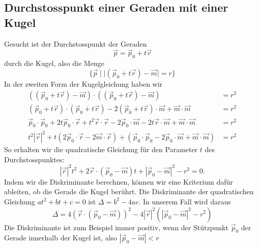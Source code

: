 \subsection{Durchstosspunkt einer Geraden mit einer Kugel
\label{durchstosspunktkugel}}
Gesucht ist der Durchstosspunkt der Geraden
\[
\vec p=\vec p_0+t\vec r
\]
durch die Kugel, also die Menge
\[
\{\vec p\;| \;|(\vec p_0+t\vec r)-\vec m|=r\}
\]
In der zweiten Form der Kugelgleichung haben wir
\begin{align*}
((\vec p_0+t\vec r)-\vec m)
\cdot
((\vec p_0+t\vec r)-\vec m)&=r^2
\\
(\vec p_0+t\vec r)
\cdot
(\vec p_0+t\vec r)
-2
(\vec p_0+t\vec r)\cdot \vec m
+\vec m\cdot\vec m&=r^2
\\
\vec p_0\cdot\vec p_0
+2t\vec p_0\cdot\vec r
+t^2\vec r\cdot\vec r
-2\vec p_0\cdot\vec m
-2t\vec r\cdot\vec m
+\vec m\cdot\vec m&=r^2
\\
t^2|\vec r|^2
+t(2\vec p_0\cdot\vec r-2\vec m\cdot\vec r)
+(\vec p_0\cdot\vec p_0-2\vec p_0\cdot\vec m+\vec m\cdot\vec m)&=r^2
\end{align*}
So erhalten wir die quadratische Gleichung für den Parameter $t$
des Durchstosspunktes:
\[
|\vec r|^2t^2
+2\vec r\cdot(\vec p_0-\vec m)t
+|\vec p_0-\vec m|^2-r^2 =0.
\]
Indem wir die Diskriminante berechnen,  können wir eine Kriterium
dafür ableiten, ob die Gerade die Kugel berührt.
Die Diskriminante
der quadratischen Gleichung $at^2+bt+c=0$ ist $\Delta = b^2-4ac$.
In unserem Fall wird daraus
\[
\Delta
=
4(\vec r\cdot(\vec p_0-\vec m))^2-
4|\vec r|^2(
|\vec p_0-\vec m|^2-r^2
)
\]
Die Diskriminante ist zum Beispiel immer positiv, wenn der Stützpunkt
$\vec p_0$
der Gerade innerhalb der Kugel ist, also $|\vec p_0-\vec m|<r$

%
%
